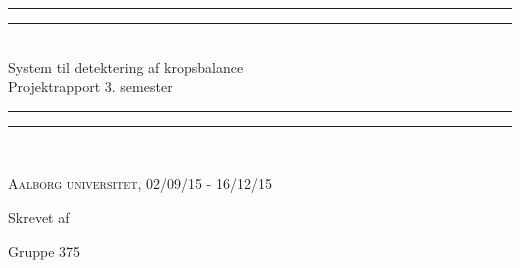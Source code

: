 \clearpage
\thispagestyle{empty}




\begin{center}
\vspace*{\baselineskip}
\rule{\textwidth}{1.6pt}\vspace*{-\baselineskip}\vspace*{2pt} %
\rule{\textwidth}{0.4pt}\\[\baselineskip] %

{\huge System til detektering af kropsbalance\\[0.3\baselineskip] \LARGE Projektrapport 3. semester}\\[0.2\baselineskip] %

\rule{\textwidth}{0.4pt}\vspace*{-\baselineskip}\vspace{3.2pt} %
\rule{\textwidth}{1.6pt}\\[\baselineskip] %
\vspace*{3\baselineskip}

\scshape %
Aalborg universitet,  02/09/15 - 16/12/15 \par %

\vspace*{2\baselineskip} %

Skrevet af \\
{\Large Gruppe 375\par}
\end{center} %

